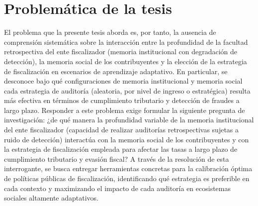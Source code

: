 \section{Problemática de la tesis}
\label{sec:problematica}

El problema que la presente tesis aborda es, por tanto, la ausencia de comprensión sistemática sobre la interacción entre la profundidad de la facultad retrospectiva del ente fiscalizador (memoria institucional con degradación de detección), la memoria social de los contribuyentes y la elección de la estrategia de fiscalización en escenarios de aprendizaje adaptativo. En particular, se desconoce bajo qué configuraciones de memoria institucional y memoria social cada estrategia de auditoría (aleatoria, por nivel de ingreso o estratégica) resulta más efectiva en términos de cumplimiento tributario y detección de fraudes a largo plazo. Responder a este problema exige formular la siguiente pregunta de investigación: ¿de qué manera la profundidad variable de la memoria institucional del ente fiscalizador (capacidad de realizar auditorías retrospectivas sujetas a ruido de detección) interactúa con la memoria social de los contribuyentes y con la estrategia de fiscalización empleada para afectar las tasas a largo plazo de cumplimiento tributario y evasión fiscal? A través de la resolución de esta interrogante, se busca entregar herramientas concretas para la calibración óptima de políticas públicas de fiscalización, identificando qué estrategia es preferible en cada contexto y maximizando el impacto de cada auditoría en ecosistemas sociales altamente adaptativos.
